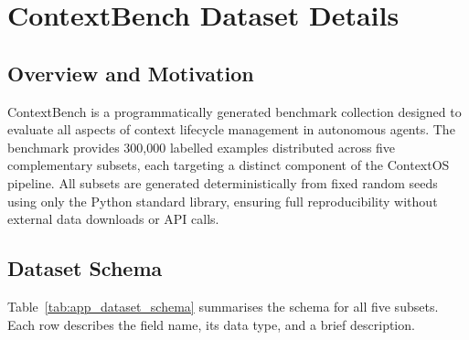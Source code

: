 
\appendix

\section{ContextBench Dataset Details}
\label{app:dataset}

\subsection{Overview and Motivation}

ContextBench is a programmatically generated benchmark collection designed to
evaluate all aspects of context lifecycle management in autonomous agents.
The benchmark provides 300{,}000 labelled examples distributed across five
complementary subsets, each targeting a distinct component of the ContextOS
pipeline.  All subsets are generated deterministically from fixed random seeds
using only the Python standard library, ensuring full reproducibility without
external data downloads or API calls.

\subsection{Dataset Schema}

Table~\ref{tab:app_dataset_schema} summarises the schema for all five subsets.
Each row describes the field name, its data type, and a brief description.

